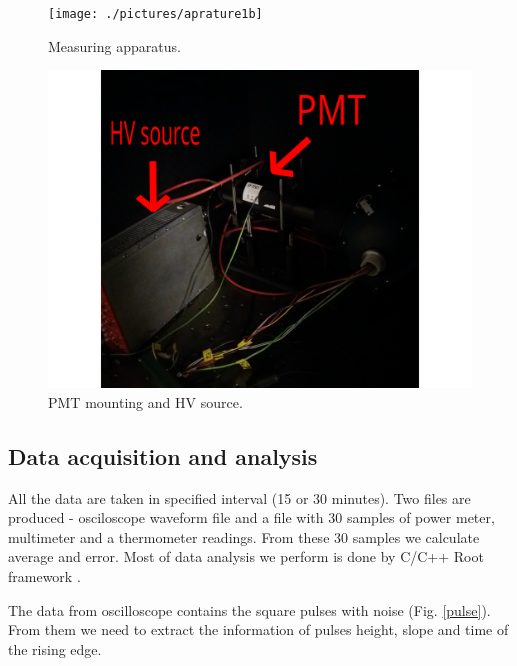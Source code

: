 \begin{figure}[H]
 \centering
 \texttt{[image: ./pictures/aprature1b]}
 \caption{Measuring apparatus.}
 \label{aparature1}
\end{figure}

\begin{figure}[H]
 \centering
 \includegraphics[scale = 0.09]{./pictures/aparature2b}
 \caption{PMT mounting and HV source.}
 \label{aparature2}
\end{figure}


\subsection{Data acquisition and analysis}
All the data are taken in specified interval (15 or 30 minutes). Two files are produced - osciloscope waveform file and a file with 30 samples of power meter, multimeter and a thermometer readings. From these 30 samples we calculate average and error. Most of data analysis we perform is done by C/C++ Root framework \cite{ROOT}.
\par
The data from oscilloscope contains the square pulses with noise (Fig. \ref{pulse}). From them we need to extract the information of pulses height, slope and time of the rising edge.


